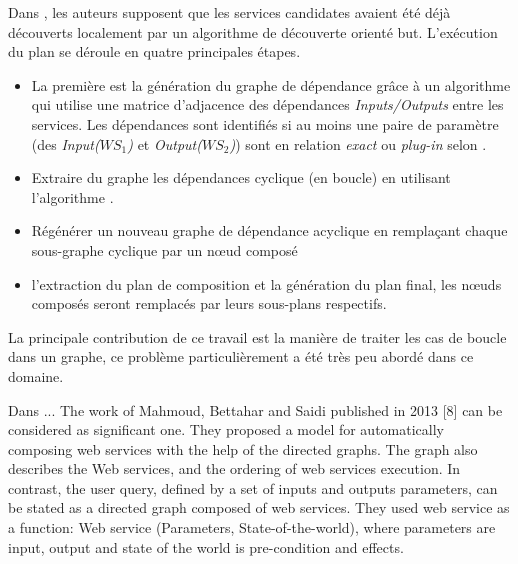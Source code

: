   \begin{text}
    Dans \cite{omer2009dependency}, les auteurs supposent que les
    services candidates avaient été déjà découverts localement par un
    algorithme de découverte orienté but. L'exécution du plan se
    déroule en quatre principales étapes.

    \SpecialItem
    \begin{itemize}
    \item La première est la génération du graphe de dépendance grâce
      à un algorithme qui utilise une matrice d'adjacence des
      dépendances \textit{Inputs/Outputs} entre les services. Les
      dépendances sont identifiés si au moins une paire de paramètre
      (des \textit{Input($WS_1$)} et \textit{Output($WS_2$)}) sont en
      relation \textit{exact} ou \textit{plug-in} selon
      \cite{paolucci2002semantic}.

    \item Extraire du graphe les dépendances cyclique (en boucle) en
      utilisant l'algorithme \cite{tarjan1973enumeration}.

    \item Régénérer un nouveau graphe de dépendance acyclique en
      remplaçant chaque sous-graphe cyclique par un nœud composé

    \item l'extraction du plan de composition et la génération du plan
      final, les nœuds composés seront remplacés par leurs sous-plans
      respectifs.
    \end{itemize}

    La principale contribution de ce travail est la manière de traiter
    les cas de boucle dans un graphe, ce problème particulièrement a été
    très peu abordé dans ce domaine.
  \end{text}

  \begin{text}
    Dans \cite{mahmoud2013towards} ... %
    The work of Mahmoud, Bettahar and Saidi published in 2013 [8] can
    be considered as significant one. They proposed a model for
    automatically composing web services with the help of the directed
    graphs. The graph also describes the Web services, and the
    ordering of web services execution. In contrast, the user query,
    defined by a set of inputs and outputs parameters, can be stated
    as a directed graph composed of web services. They used web
    service as a function: Web service (Parameters,
    State-of-the-world), where parameters are input, output and state
    of the world is pre-condition and effects.
  \end{text}

